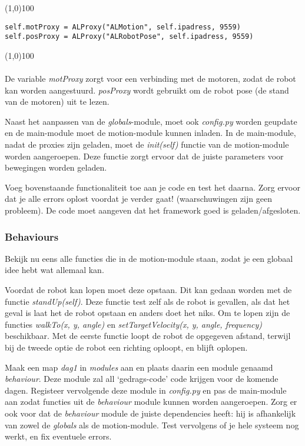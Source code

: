 \documentclass[a4paper]{article}
\begin{document}
\noindent \line(1,0){100}
\begin{verbatim}
self.motProxy = ALProxy("ALMotion", self.ipadress, 9559)
self.posProxy = ALProxy("ALRobotPose", self.ipadress, 9559)
\end{verbatim}
\noindent \line(1,0){100}
\\\\
De variable \textit{motProxy} zorgt voor een verbinding met de motoren, zodat de robot kan worden aangestuurd. \textit{posProxy} wordt gebruikt om de robot pose (de stand van de motoren) uit te lezen. 

Naast het aanpassen van de \textit{globals}-module, moet ook \textit{config.py} worden geupdate en de main-module moet de motion-module kunnen inladen.
In de main-module, nadat de proxies zijn geladen, moet de \textit{init(self)} functie van de motion-module worden aangeroepen. Deze functie zorgt ervoor dat de juiste parameters voor bewegingen worden geladen.

Voeg bovenstaande functionaliteit toe aan je code en test het daarna. Zorg ervoor dat je alle errors oplost voordat je verder gaat! (waarschuwingen zijn geen probleem). De code moet aangeven dat het framework goed is geladen/afgesloten.

\subsubsection{Behaviours}
Bekijk nu eens alle functies die in de motion-module staan, zodat je een globaal idee hebt wat allemaal kan.

Voordat de robot kan lopen moet deze opstaan. Dit kan gedaan worden met de functie \textit{standUp(self)}.
Deze functie test zelf als de robot is gevallen, als dat het geval is laat het de robot opstaan en anders doet het niks.
Om te lopen zijn de functies \textit{walkTo(x, y, angle)} en \textit{setTargetVelocity(x, y, angle, frequency)} beschikbaar.
Met de eerste functie loopt de robot de opgegeven afstand, terwijl bij de tweede optie de robot een richting oploopt, en blijft oplopen.

Maak een map \textit{dag1} in \textit{modules} aan en plaats daarin een module genaamd \textit{behaviour}. Deze module zal all `gedrags-code' code krijgen voor de komende dagen.
Registeer vervolgende deze module in \textit{config.py} en pas de main-module aan zodat functies uit de \textit{behaviour} module kunnen worden aangeroepen. Zorg er ook voor dat 
de \textit{behaviour} module de juiste dependencies heeft: hij is afhankelijk van zowel de \textit{globals} als de motion-module. Test vervolgens of je hele systeem nog werkt, en fix eventuele errors.
\end{document}
